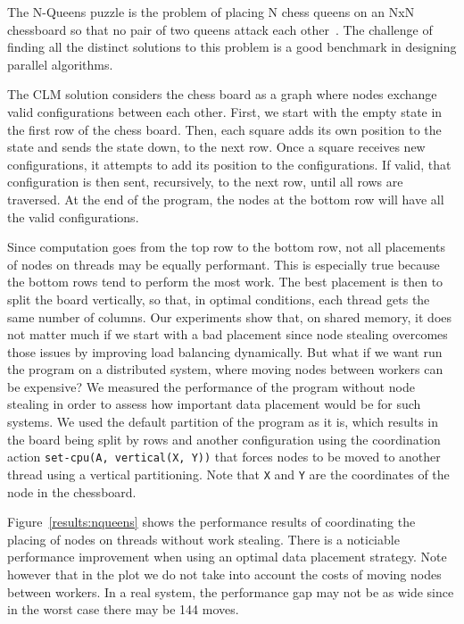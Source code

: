 The N-Queens puzzle is the problem of placing N chess queens on an NxN
chessboard so that no pair of two queens attack each
other~\cite{8queens}. The challenge of finding all the
distinct solutions to this problem is a good benchmark in designing
parallel algorithms.

The CLM solution considers the chess board as a graph where nodes exchange valid
configurations between each other. First, we start with the empty
state in the first row of the chess board. Then, each square adds its own
position to the state and sends the state down, to the next row. Once a square
receives new configurations, it attempts to add its position to the
configurations. If valid, that configuration is then sent, recursively, to the
next row, until all rows are traversed. At the end of the program, the nodes at
the bottom row will have all the valid configurations.

Since computation goes from the top row to the bottom row, not all placements of
nodes on threads may be equally performant. This is especially true because the
bottom rows tend to perform the most work. The best placement is then to split the
board vertically, so that, in optimal conditions, each thread gets the same
number of columns.  Our experiments show that, on shared memory, it does not
matter much if we start with a bad placement since node stealing overcomes those
issues by improving load balancing dynamically. But what if we want run the
program on a distributed system, where moving nodes between workers can be
expensive? We measured the performance of the program without node stealing in
order to assess how important data placement would be for such systems.
We used the default partition of the program as it is, which results in the board being
split by rows and another configuration using the coordination action
\texttt{set-cpu(A, vertical(X, Y))} that forces nodes to be moved to another
thread using a vertical partitioning. Note that \texttt{X} and \texttt{Y} are
the coordinates of the node in the chessboard.

Figure~\ref{results:nqueens} shows the performance results of coordinating the
placing of nodes on threads without work stealing. There is a noticiable
performance improvement when using an optimal data placement strategy. Note
however that in the plot we do not take into account the costs of moving
nodes between workers. In a real system, the performance gap may not be as wide
since in the worst case there may be 144 moves.

